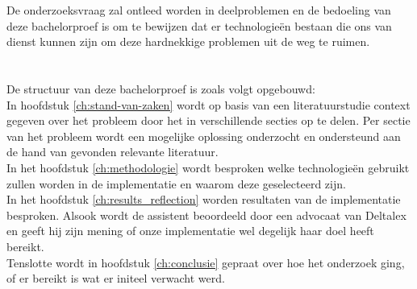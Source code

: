 De onderzoeksvraag zal ontleed worden in deelproblemen en de bedoeling van deze bachelorproef is
om te bewijzen dat er technologieën bestaan die ons van dienst kunnen zijn om deze hardnekkige problemen uit de weg te ruimen.

\section{}%
\label{sec:opzet-bachelorproef}


De structuur van deze bachelorproef is zoals volgt opgebouwd:\\

In hoofdstuk \ref{ch:stand-van-zaken} wordt op basis van een literatuurstudie context gegeven over het probleem door het in verschillende secties op te delen.
Per sectie van het probleem wordt een mogelijke oplossing onderzocht en ondersteund aan de hand van gevonden relevante literatuur. \\

In het hoofdstuk \ref{ch:methodologie} wordt besproken welke technologieën gebruikt zullen worden in de implementatie en waarom deze geselecteerd zijn. \\

In het hoofdstuk \ref{ch:results_reflection} worden resultaten van de implementatie besproken.
Alsook wordt de assistent beoordeeld door een advocaat van Deltalex en geeft hij zijn mening of onze implementatie wel degelijk haar doel heeft bereikt. \\

Tenslotte wordt in hoofdstuk \ref{ch:conclusie} gepraat over hoe het onderzoek ging, of er bereikt is wat er initeel verwacht werd.
